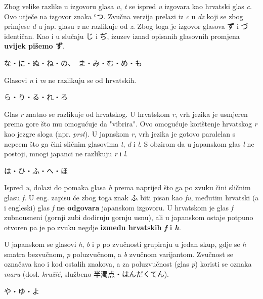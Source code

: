 	Zbog velike razlike u izgovoru glasa \textit{u}, \textit{t} se ispred \textit{u} izgovara kao hrvatski glas \textit{c}. Ovo utječe na izgovor znaka $^c$つ. Zvučna verzija prelazi iz \textit{c} u \textit{dz} koji se zbog primjese \textit{d} u jap. glasu \textit{z} ne razlikuje od \textit{z}. Zbog toga je izgovor glasova ず i づ identičan. Kao i u slučaju じ i ぢ, izuzev iznad opisanih glasovnih promjena \textbf{uvijek pišemo ず}.
	
	\vspace{5pt}
	\noindent\ten な・に・ぬ・ね・の、　ま・み・む・め・も
	
	Glasovi \textit{n} i \textit{m} ne razlikuju se od hrvatskih.
	
	\vspace{5pt}
	\noindent\ten ら・り・る・れ・ろ
	
	Glas \textit{r} znatno se razlikuje od hrvatskog. U hrvatskom \textit{r}, vrh jezika je usmjeren prema gore što mu omogućuje da "vibrira". Ovo omogućuje korištenje hrvatskog \textit{r} kao jezgre sloga (npr. \textit{prst}). U japnskom \textit{r}, vrh jezika je gotovo paralelan s nepcem što ga čini sličnim glasovima \textit{t}, \textit{d} i \textit{l}. S obzirom da u japanskom glas \textit{l} ne postoji, mnogi japanci ne razlikuju \textit{r} i \textit{l}.
	
	\vspace{5pt}
	\noindent\ten は・ひ・ふ・へ・ほ
	
	Ispred \textit{u}, dolazi do pomaka glasa \textit{h} prema naprijed što ga po zvuku čini sličnim glasu \textit{f}. U eng. zapisu će zbog toga znak ふ biti pisan kao \textit{fu}, međutim hrvatski (a i engleski) glas \textit{f} \textbf{ne odgovara} japanskom izgovoru. U hrvatskom je glas \textit{f} zubnousneni (gornji zubi dodiruju gornju usnu), ali u japanskom ostaje potpuno otvoren pa je po zvuku negdje \textbf{između hrvatskih \textit{f} i \textit{h}}.
	
	U japanskom se glasovi \textit{h}, \textit{b} i \textit{p} po zvučnosti grupiraju u jedan skup, gdje se \textit{h} smatra bezvučnom, \textit{p} poluzvučnom\footnotemark[2], a \textit{b} zvučnom varijantom. Zvučnost se označava kao i kod ostalih znakova, a za poluzvučnost (glas \textit{p}) koristi se oznaka \textit{maru} (dosl. \textit{kružić}, službeno 半濁点・はんだくてん).
	
	
	\vspace{5pt}
	\noindent\ten や・ゆ・よ
	
